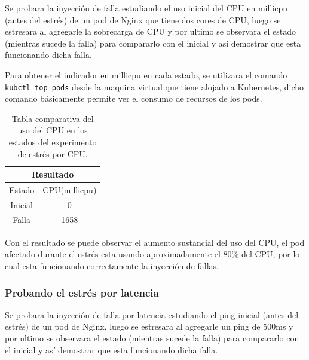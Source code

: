 \par Se probara la inyección de falla estudiando el uso inicial del CPU en millicpu (antes del estrés) de un pod de Nginx que tiene dos cores de CPU, luego se estresara al agregarle la sobrecarga de CPU y por ultimo se observara el estado (mientras sucede la falla) para compararlo con el inicial y así demostrar que esta funcionando dicha falla.\\

\par Para obtener el indicador en millicpu en cada estado, se utilizara el comando \\ \verb|kubctl top pods| desde la maquina virtual que tiene alojado a Kubernetes, dicho comando básicamente permite ver el consumo de recursos de los pods.\\

\begin{table}[ht!]
\begin{center}
\begin{tabular}{ |c|c| } 
 \hline
 \multicolumn{2}{|c|}{Resultado} \\
 \hline
 \hline
 Estado & CPU(millicpu)\\
 \hline
 Inicial & 0\\
 Falla & 1658\\
 \hline
\end{tabular}
\end{center}
\caption{Tabla comparativa del uso del CPU en los estados del experimento de estrés por CPU.}
\label{tab:tabla41}
\end{table}


\par Con el resultado se puede observar el aumento sustancial del uso del CPU, el pod afectado durante el estrés esta usando aproximadamente el 80\% del CPU, por lo cual esta funcionando correctamente la inyección de fallas.\\

\subsubsection{Probando el estrés por latencia}


\par Se probara la inyección de falla por latencia estudiando el ping inicial (antes del estrés) de un pod de Nginx, luego se estresara al agregarle un ping de 500ms y por ultimo se observara el estado (mientras sucede la falla) para compararlo con el inicial y así demostrar que esta funcionando dicha falla.\\

